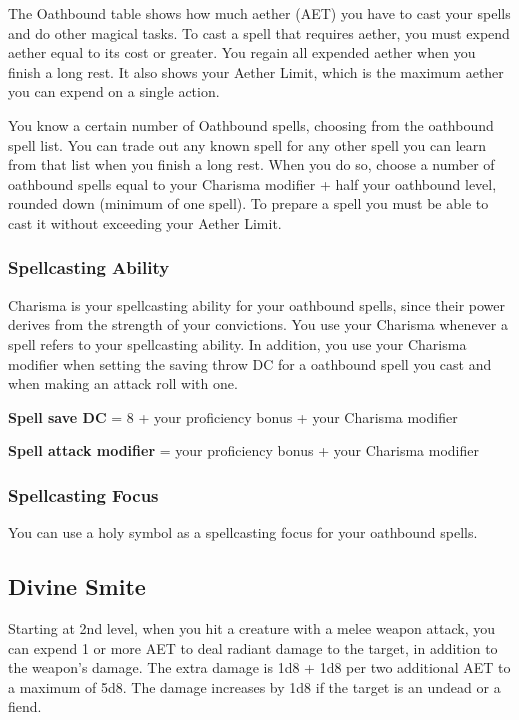 The Oathbound table shows how much aether (AET) you have to cast your spells and do other magical tasks. To cast a spell that requires aether, you must expend aether equal to its cost or greater. You regain all expended aether when you finish a long rest. It also shows your Aether Limit, which is the maximum aether you can expend on a single action.

You know a certain number of Oathbound spells, choosing from the oathbound spell list. You can trade out any known spell for any other spell you can learn from that list when you finish a long rest. When you do so, choose a number of oathbound spells equal to your Charisma modifier + half your oathbound level, rounded down (minimum of one spell). To prepare a spell you must be able to cast it without exceeding your Aether Limit.

\subsubsection{Spellcasting Ability}

Charisma is your spellcasting ability for your oathbound spells, since their power derives from the strength of your convictions. You use your Charisma whenever a spell refers to your spellcasting ability. In addition, you use your Charisma modifier when setting the saving throw DC for a oathbound spell you cast and when making an attack roll with one.

\textbf{Spell save DC} = 8 + your proficiency bonus + your Charisma modifier

\textbf{Spell attack modifier} = your proficiency bonus + your Charisma modifier

\subsubsection{Spellcasting Focus}

You can use a holy symbol as a spellcasting focus for your oathbound spells.

\subsection{Divine Smite}

Starting at 2nd level, when you hit a creature with a melee weapon attack, you can expend 1 or more AET to deal radiant damage to the target, in addition to the weapon's damage. The extra damage is 1d8 + 1d8 per two additional AET to a maximum of 5d8. The damage increases by 1d8 if the target is an undead or a fiend.

